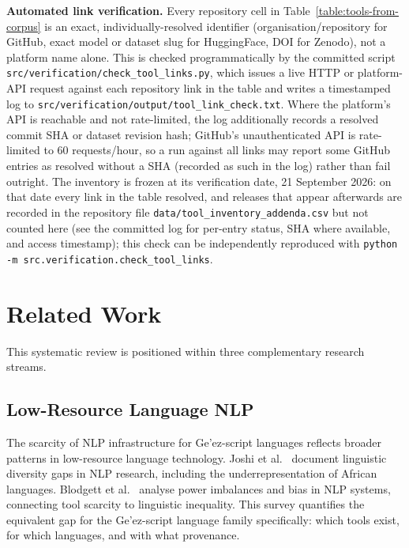 \documentclass[sn-mathphys-num]{sn-jnl}
\theoremstyle{thmstyleone}
\theoremstyle{thmstyletwo}
\theoremstyle{thmstylethree}
\begin{document}
\textbf{Automated link verification.} Every repository cell in Table~\ref{table:tools-from-corpus} is an exact, individually-resolved identifier (organisation/repository for GitHub, exact model or dataset slug for HuggingFace, DOI for Zenodo), not a platform name alone. This is checked programmatically by the committed script \texttt{src/verification/check\_tool\_links.py}, which issues a live HTTP or platform-API request against each repository link in the table and writes a timestamped log to \texttt{src/verification/output/tool\_link\_check.txt}. Where the platform's API is reachable and not rate-limited, the log additionally records a resolved commit SHA or dataset revision hash; GitHub's unauthenticated API is rate-limited to 60 requests/hour, so a run against all links may report some GitHub entries as resolved without a SHA (recorded as such in the log) rather than fail outright. The inventory is frozen at its verification date, 21 September 2026: on that date every link in the table resolved, and releases that appear afterwards are recorded in the repository file \texttt{data/tool\_inventory\_addenda.csv} but not counted here (see the committed log for per-entry status, SHA where available, and access timestamp); this check can be independently reproduced with \texttt{python -m src.verification.check\_tool\_links}.

\section{Related Work}\label{sec:related}

This systematic review is positioned within three complementary research streams.

\subsection{Low-Resource Language NLP}

The scarcity of NLP infrastructure for Ge'ez-script languages reflects broader patterns in low-resource language technology. Joshi et al.\ \citep{joshi_state_2020} document linguistic diversity gaps in NLP research, including the underrepresentation of African languages. Blodgett et al.\ \citep{blodgett_language_2021} analyse power imbalances and bias in NLP systems, connecting tool scarcity to linguistic inequality. This survey quantifies the equivalent gap for the Ge'ez-script language family specifically: which tools exist, for which languages, and with what provenance.
\end{document}
